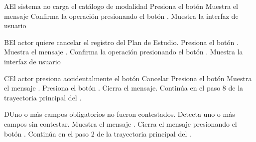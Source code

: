 
\begin{UCtrayectoriaA}{A}{El sistema no carga el catálogo de modalidad}
	\UCpaso[\UCactor] Presiona el botón 
	\UCpaso Muestra el mensaje 
	\UCpaso[\UCactor] Confirma la operación presionando el botón .
	 \UCpaso Muestra la interfaz de usuario 

\end{UCtrayectoriaA}



\begin{UCtrayectoriaA}{B}{El actor quiere cancelar el registro del Plan de Estudio.}
	\UCpaso[\UCactor] Presiona el botón .
	\UCpaso Muestra el mensaje .
	\UCpaso[\UCactor] Confirma la operación presionando el botón .
	\UCpaso Muestra la interfaz de usuario 
\end{UCtrayectoriaA}




\begin{UCtrayectoriaA}{C}{El actor presiona accidentalmente el botón Cancelar}
	\UCpaso[\UCactor] Presiona el botón 
	\UCpaso Muestra el mensaje .
	\UCpaso[\UCactor] Presiona el botón .
	\UCpaso Cierra el mensaje.
	\UCpaso Continúa en el paso 8 de la trayectoria principal del .
\end{UCtrayectoriaA}




\begin{UCtrayectoriaA}{D}{Uno o más campos obligatorios no fueron contestados.}
	\UCpaso Detecta uno o más campos sin contestar.
	\UCpaso Muestra el mensaje .
	\UCpaso[\UCactor] Cierra el mensaje presionando el botón .
	\UCpaso Continúa en el paso 2 de la trayectoria principal del .
\end{UCtrayectoriaA}
